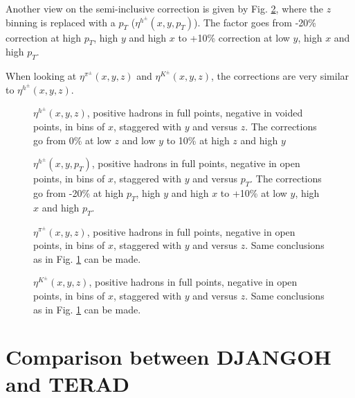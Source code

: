 Another view on the semi-inclusive correction is given by Fig. \ref{fig:hadpt_ratio}, where the $z$ binning is replaced with a
$p_T$ ($\eta^{h^{\pm}}(x,y,p_T)$). The factor goes from -20\% correction at high $p_T$, high $y$ and high $x$
to +10\% correction at low $y$, high $x$ and high $p_T$.

When looking at $\eta^{\pi^{\pm}}(x,y,z)$ and $\eta^{K^{\pm}}(x,y,z)$, the corrections are very similar to $\eta^{h^{\pm}}(x,y,z)$.

\begin{figure}[!htb]
\centerline{}
\caption{$\eta^{h^{\pm}}(x,y,z)$, positive hadrons in full points, negative in voided points, in bins of $x$, staggered with $y$ and versus $z$.
The corrections go from 0\% at low $z$ and low $y$ to 10\% at high $z$ and high $y$}\label{fig:hadz_ratio}
\end{figure}

\begin{figure}[!htb]
\centerline{}
\caption{$\eta^{h^{\pm}}(x,y,p_T)$, positive hadrons in full points, negative in open points, in bins of $x$, staggered with $y$ and versus $p_T$.
The corrections go from -20\% at high $p_T$, high $y$ and high $x$ to +10\% at low $y$, high $x$ and high $p_T$.}\label{fig:hadpt_ratio}
\end{figure}

\begin{figure}[!htb]
\centerline{}
\caption{$\eta^{\pi^{\pm}}(x,y,z)$, positive hadrons in full points, negative in open points, in bins of $x$, staggered with $y$ and versus $z$.
Same conclusions as in Fig. \ref{fig:hadz_ratio} can be made.}\label{fig:piz_ratio}
\end{figure}

\begin{figure}[!htb]
\centerline{}
\caption{$\eta^{K^{\pm}}(x,y,z)$, positive hadrons in full points, negative in open points, in bins of $x$, staggered with $y$ and versus $z$.
Same conclusions as in Fig. \ref{fig:hadz_ratio} can be made.}\label{fig:kz_ratio}
\end{figure}


\section{Comparison between DJANGOH and TERAD}

